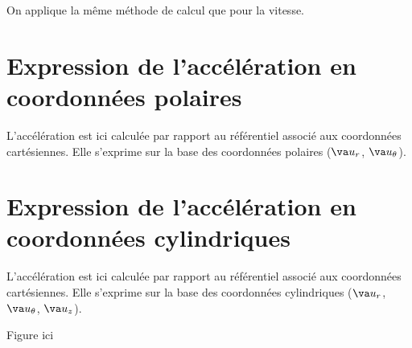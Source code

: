 \documentclass[
  12pt,
  openany]{book}
\theoremstyle{plain}
\theoremstyle{remark}
\begin{document}
On applique la même méthode de calcul que pour la vitesse.

\section{Expression de l'accélération en coordonnées
polaires}\label{expression-de-laccuxe9luxe9ration-en-coordonnuxe9es-polaires}

L'accélération est ici calculée par rapport au référentiel associé aux
coordonnées cartésiennes. Elle s'exprime sur la base des coordonnées
polaires (\(\va u_r\), \(\va u_\theta\)).

\section{Expression de l'accélération en coordonnées
cylindriques}\label{expression-de-laccuxe9luxe9ration-en-coordonnuxe9es-cylindriques}

L'accélération est ici calculée par rapport au référentiel associé aux
coordonnées cartésiennes. Elle s'exprime sur la base des coordonnées
cylindriques (\(\va u_r\), \(\va u_\theta\), \(\va u_z\)).

Figure ici


\backmatter
\end{document}
